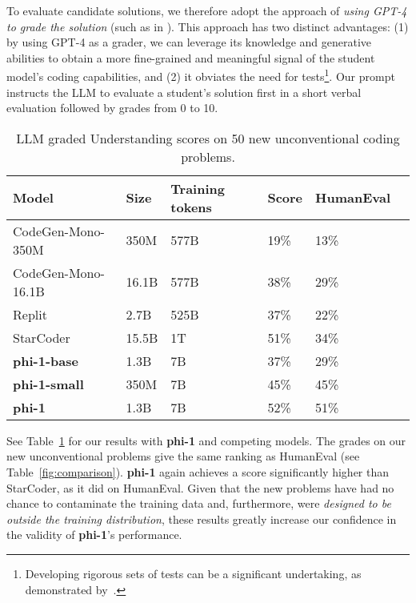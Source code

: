 To evaluate candidate solutions, we therefore adopt the approach of \emph{using GPT-4 to grade the solution} (such as in \cite{eldan2023tinystories}). This approach has two distinct advantages: (1) by using GPT-4 as a grader, we can leverage its knowledge and generative abilities to obtain a more fine-grained and meaningful signal of the student model's coding capabilities, and (2) it obviates the need for tests\footnote{Developing rigorous sets of tests can be a significant undertaking, as demonstrated by~\cite{evalplus}.}. Our prompt instructs the LLM to evaluate a student's solution first in a short verbal evaluation followed by grades from 0 to 10.

\begin{table}
\small
\begin{center}
\begin{tabular}{llllll}
\hline
Model & Size & Training tokens & Score & HumanEval\\ %
\hline
CodeGen-Mono-350M \cite{nijkamp2022codegen} & 350M & 577B & 19\% & 13\%\\ %
CodeGen-Mono-16.1B \cite{nijkamp2022codegen} & 16.1B & 577B & 38\% & 29\% \\ %
Replit \cite{replit} & 2.7B & 525B & 37\% & 22\%\\ %
StarCoder \cite{li2023starcoder} & 15.5B & 1T & 51\% & 34\% \\ %
\hline
\textbf{phi-1-base} & 1.3B & 7B & 37\% & 29\% \\ %
\textbf{phi-1-small} & 350M & 7B & 45\% & 45\% \\ %
\textbf{phi-1} & 1.3B & 7B & 52\% & 51\% \\ %
\hline
\end{tabular}
\caption{LLM graded Understanding scores on 50 new unconventional coding problems.}
\label{fig:esoteric}
\end{center}
\end{table}

See Table~\ref{fig:esoteric} for our results with \textbf{phi-1} and competing models.
The grades on our new unconventional problems give the same ranking as HumanEval (see Table~\ref{fig:comparison}).
\textbf{phi-1} again achieves a score significantly higher than StarCoder, as it did on HumanEval.
Given that the new problems have had no chance to contaminate the training data and, furthermore, were \emph{designed to be outside the training distribution}, these results greatly increase our confidence in the validity of \textbf{phi-1}'s performance.

